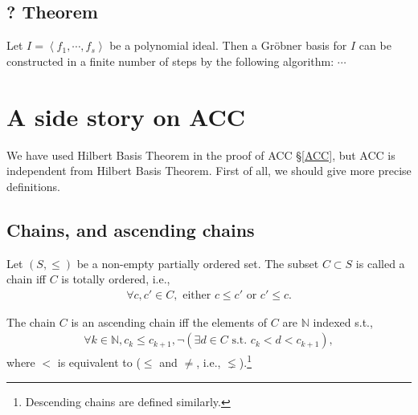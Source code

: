 \documentclass[11pt]{book}
\begin{document}
\subsection{? Theorem}
Let $I = \left< f_1, \cdots, f_s \right>$ be a polynomial ideal.
Then a Gr\"obner basis for $I$ can be constructed in a finite number of steps by the following algorithm: $\cdots$

\section{A side story on ACC}
We have used Hilbert Basis Theorem in the proof of ACC \S\ref{ACC}, but ACC is independent from Hilbert Basis Theorem.
First of all, we should give more precise definitions.

\subsection{Chains, and ascending chains}
Let $(S, \leq)$ be a non-empty partially ordered set.
The subset $C \subset S$ is called a chain iff $C$ is totally ordered, i.e.,
\begin{eqnarray}
\forall c,c' \in C, \text{ either } c \leq c' \text{ or } c' \leq c.
\end{eqnarray}

The chain $C$ is an ascending chain iff the elements of $C$ are $\mathbb{N}$ indexed s.t.,
\begin{eqnarray}
\forall k \in \mathbb{N}, c_k \leq c_{k+1}, \lnot (\exists d \in C \text{ s.t. } c_k < d < c_{k+1}),
\end{eqnarray}
where $<$ is equivalent to ($\leq$ and $\neq$, i.e., $\lneq$).\footnote{Descending chains are defined similarly.}
\end{document}
